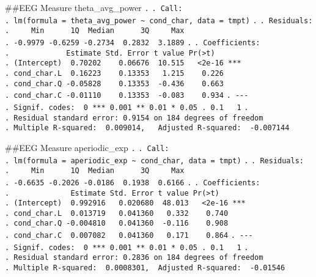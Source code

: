 \documentclass[
]{article}
\begin{document}
\#\#EEG Measure theta\_avg\_power \texttt{.} \texttt{.\ Call:}
\texttt{.\ lm(formula\ =\ theta\_avg\_power\ \textasciitilde{}\ cond\_char,\ data\ =\ tmpt)}
\texttt{.} \texttt{.\ Residuals:}
\texttt{.\ \ \ \ \ Min\ \ \ \ \ \ 1Q\ \ Median\ \ \ \ \ \ 3Q\ \ \ \ \ Max}
\texttt{.\ -0.9979\ -0.6259\ -0.2734\ \ 0.2832\ \ 3.1889} \texttt{.}
\texttt{.\ Coefficients:}
\texttt{.\ \ \ \ \ \ \ \ \ \ \ \ \ Estimate\ Std.\ Error\ t\ value\ Pr(\textgreater{}\textbar{}t\textbar{})}
\texttt{.\ (Intercept)\ \ 0.70202\ \ \ \ 0.06676\ \ 10.515\ \ \ \textless{}2e-16\ ***}
\texttt{.\ cond\_char.L\ \ 0.16223\ \ \ \ 0.13353\ \ \ 1.215\ \ \ \ 0.226}
\texttt{.\ cond\_char.Q\ -0.05828\ \ \ \ 0.13353\ \ -0.436\ \ \ \ 0.663}
\texttt{.\ cond\_char.C\ -0.01110\ \ \ \ 0.13353\ \ -0.083\ \ \ \ 0.934}
\texttt{.\ -\/-\/-}
\texttt{.\ Signif.\ codes:\ \ 0\ \textquotesingle{}***\textquotesingle{}\ 0.001\ \textquotesingle{}**\textquotesingle{}\ 0.01\ \textquotesingle{}*\textquotesingle{}\ 0.05\ \textquotesingle{}.\textquotesingle{}\ 0.1\ \textquotesingle{}\ \textquotesingle{}\ 1}
\texttt{.}
\texttt{.\ Residual\ standard\ error:\ 0.9154\ on\ 184\ degrees\ of\ freedom}
\texttt{.\ Multiple\ R-squared:\ \ 0.009014,\ \ \ Adjusted\ R-squared:\ \ -0.007144}

\#\#EEG Measure aperiodic\_exp \texttt{.} \texttt{.\ Call:}
\texttt{.\ lm(formula\ =\ aperiodic\_exp\ \textasciitilde{}\ cond\_char,\ data\ =\ tmpt)}
\texttt{.} \texttt{.\ Residuals:}
\texttt{.\ \ \ \ \ Min\ \ \ \ \ \ 1Q\ \ Median\ \ \ \ \ \ 3Q\ \ \ \ \ Max}
\texttt{.\ -0.6635\ -0.2026\ -0.0186\ \ 0.1938\ \ 0.6166} \texttt{.}
\texttt{.\ Coefficients:}
\texttt{.\ \ \ \ \ \ \ \ \ \ \ \ \ \ Estimate\ Std.\ Error\ t\ value\ Pr(\textgreater{}\textbar{}t\textbar{})}
\texttt{.\ (Intercept)\ \ 0.992916\ \ \ 0.020680\ \ 48.013\ \ \ \textless{}2e-16\ ***}
\texttt{.\ cond\_char.L\ \ 0.013719\ \ \ 0.041360\ \ \ 0.332\ \ \ \ 0.740}
\texttt{.\ cond\_char.Q\ -0.004810\ \ \ 0.041360\ \ -0.116\ \ \ \ 0.908}
\texttt{.\ cond\_char.C\ \ 0.007082\ \ \ 0.041360\ \ \ 0.171\ \ \ \ 0.864}
\texttt{.\ -\/-\/-}
\texttt{.\ Signif.\ codes:\ \ 0\ \textquotesingle{}***\textquotesingle{}\ 0.001\ \textquotesingle{}**\textquotesingle{}\ 0.01\ \textquotesingle{}*\textquotesingle{}\ 0.05\ \textquotesingle{}.\textquotesingle{}\ 0.1\ \textquotesingle{}\ \textquotesingle{}\ 1}
\texttt{.}
\texttt{.\ Residual\ standard\ error:\ 0.2836\ on\ 184\ degrees\ of\ freedom}
\texttt{.\ Multiple\ R-squared:\ \ 0.0008301,\ \ Adjusted\ R-squared:\ \ -0.01546}
\end{document}

